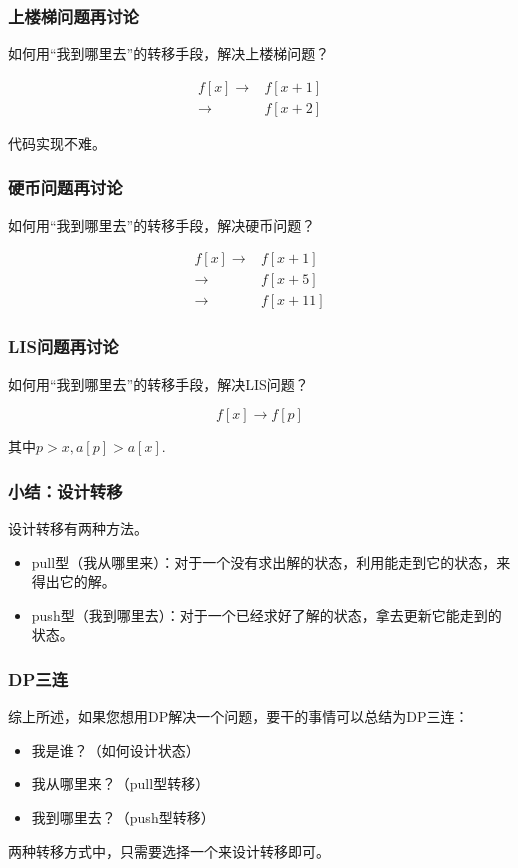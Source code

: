 \documentclass{beamer}
\begin{document}
\begin{frame}
    \frametitle{上楼梯问题再讨论}

    如何用“我到哪里去”的转移手段，解决上楼梯问题？

    \pause
    \[\begin{aligned}
        f[x] \rightarrow & f[x+1] \\
        \rightarrow & f[x+2]
        \end{aligned}\]
    
    代码实现不难。

\end{frame}


\begin{frame}
    \frametitle{硬币问题再讨论}

    如何用“我到哪里去”的转移手段，解决硬币问题？

    \pause
    \[\begin{aligned}
        f[x] \rightarrow & f[x+1] \\
        \rightarrow & f[x+5] \\
        \rightarrow & f[x+11]
        \end{aligned}\]
    

\end{frame}


\begin{frame}
    \frametitle{LIS问题再讨论}

    如何用“我到哪里去”的转移手段，解决LIS问题？

    \pause
    
    \[f[x] \rightarrow f[p]\]

    其中$p>x, a[p]>a[x]$.
    
\end{frame}

\begin{frame}
    \frametitle{小结：设计转移}

    设计转移有两种方法。

    \begin{itemize}
        \item pull型（我从哪里来）：对于一个没有求出解的状态，利用能走到它的状态，来得出它的解。
        \item push型（我到哪里去）：对于一个已经求好了解的状态，拿去更新它能走到的状态。
    \end{itemize}

\end{frame}

\begin{frame}
    \frametitle{DP三连}

    综上所述，如果您想用DP解决一个问题，要干的事情可以总结为DP三连：

    \begin{itemize}
        \item 我是谁？（如何设计状态）
        \item 我从哪里来？（pull型转移）
        \item 我到哪里去？（push型转移）
    \end{itemize}

    两种转移方式中，只需要选择一个来设计转移即可。

\end{frame}
\end{document}
